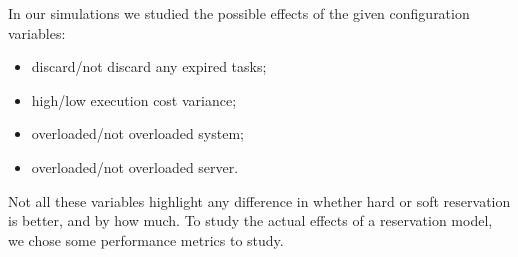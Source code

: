 \documentclass[times, 10pt,twocolumn]{article}
\begin{document}
\label{sec:controled-variables}

In our simulations we studied the possible effects of the given
configuration variables:
\begin{itemize}
\item discard/not discard any expired tasks;
\item high/low execution cost variance;
\item overloaded/not overloaded system;
\item overloaded/not overloaded server.
\end{itemize}

Not all these variables highlight any difference in whether hard or
soft reservation is better, and by how much. To study the actual
effects of a reservation model, we chose some performance metrics to study.

\label{sec:metrics}
\end{document}
